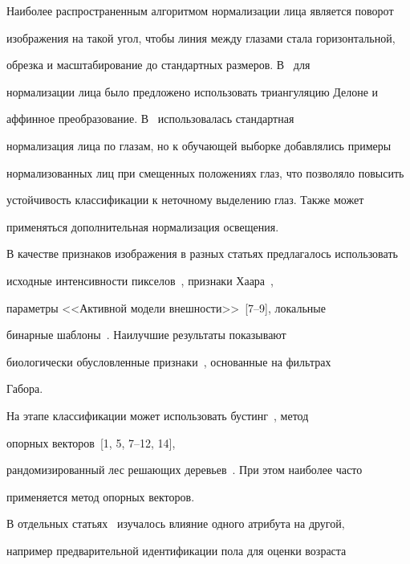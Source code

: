 Наиболее распространенным алгоритмом нормализации лица является поворот 


изображения на такой угол, чтобы линия между глазами стала горизонтальной, 


обрезка и масштабирование до стандартных размеров. В~\cite{20-k} для 


нормализации лица было предложено использовать триангуляцию Делоне и 


аффинное преобразование. В~\cite{13-k} использовалась стандартная 


нормализация лица по глазам, но к обучающей выборке добавлялись примеры 


нормализованных лиц при смещенных положениях глаз, что позволяло повысить 


устойчивость классификации к неточному выделению глаз. Также может 


применяться дополнительная нормализация освещения.











В качестве признаков изображения в разных статьях предлагалось использовать 


исходные интенсивности пикселов~\cite{14-k, 1-k}, признаки Хаара~\cite{12-k}, 


параметры <<Активной модели внешности>>~[7--9], локальные 


бинарные шаблоны~\cite{11-k, 18-k}. Наилучшие результаты показывают 


биологически обусловленные признаки~\cite{16-k, 7-k}, основанные на фильтрах 


Габора. 





На этапе классификации может использовать бустинг~\cite{1-k, 12-k, 18-k}, метод 


опорных векторов~[1, 5, 7--12, 14], 


рандомизированный лес решающих деревьев~\cite{15-k}. При этом наиболее часто 


применяется метод опорных векторов.





В отдельных статьях~\cite{7-k, 4-k} изучалось влияние одного атрибута на другой, 


например предварительной идентификации пола для оценки возраста~\cite{7-k} 


